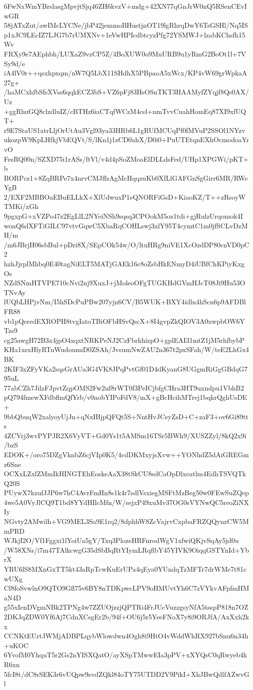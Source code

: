 6FwNxWmYBrslasgMpvjtSjq46ZH6kvzV+mdg+42XN77qGnJrW0nQ5RSenCEvIwGR
58jATxZut/awIMcLYCNe/jbP42jemmoBHustjnOT19lgRhrqDwY6TsGSHl/Nq5IS
p1xJC9LEcIZ7LJG7b7rUMXNv+1eVwHPIcdbtcyzPfg72YSMWJ+lzabKChsfh15Wv
FRXy9e7AEphbh/LUXaZ9vzCP5Z/4BoXUW0o9MuURB9u1yRmG2BoOt1l+7VSy9d/e
iA4lV0r++qsxhpxqm/nW7Q5LbX11SHdhX5PBpaoA5xWcx/KP4vW69grWpkaA27g+
/haMCxhfbSfsXVss6qqkECZ3bS+VZ6pFj83HsOSnTKT3HAAMyfZYqjf8Qs0AX/Uz
+ggRhuGQ8clzdluIZ/cBTHz6iaCTqfWCzM4csl+nmTvvCuahHomEq87XI9xfUQT+
r9E7StaUS1atrLljOrUtAu3Vgl93ya33HRb6L1gRUfMCUqPf0fMVuP2SSOl1NYzv
ukozpW9KpLHfkjVbEQVt/S/lKn1j1zCD0ahX/D0i0+PuUTEtqnEXhOcmodoaYrvO
FesRQ00n/SZXD75i1rASs/ftVl/v4d4pSoZMoaElDLLdsFed/UHp1XPGWi/pKT+b
BORPcz1+8ZqBRPe7x4nrvCMJffzAgMcHqqzuKb0XfLlGAFGnSgGirr6MR/RWeYgB
2/EXF2MBBOaEBuELLkX+XlUdwuxP1eQNORFiGsD+KiaoKZ/T++zRsoyWTMKi/xGh
9pgxpG+xVZPo47z2EgLlL2NYeiNSh9sqsq3CPOokM5oz1tdi+gjRulzUrqomok4I
wonQ6dXFTiGILC97vtvGqwC5XbaRqCOHLswj3xlY95T4cymtC1m0jfSCLvDzMH/m
/m6JBrjH06sbBul+pDri8X/SEpCOk54w/O/ltuHRg9niVE1XcOzdDP80cnVD0pC2
hzhJjrplMhbq0E40tagNiELT5MATjGAEk16c8oZsbHkENmyD4iUBfChKPiyKxgOs
NZdSNmHTVPE710cNvi2nj9XuxJ+jMoleoOFgTUGKHdGVmHJcT08Ji9Hu53OTNvAy
lUQbLHPjvNm/I5hSDcPuPBw207yjn6CV/B5WUK+BXY4idln4hScn6p9AFDBlFR88
vb1pQeredEXROPH8tvgIatoTBiOFbHSvQscX+8I4gvpZkQIOV3A0xwpbOW6YTzs9
cg25awgH72B3x4jpO4xqxtNRKPeNJ2CzFbrkhizpO+gplEAI31mtZ1jM5rhfbybP
KHa1xsxHlyRTuWudounuD0ZSAh/JvsumNwZAU2n367t2pxSFah/W/teE2LhGx4BK
2KIF3xZFyVKa2sqsGrAUa3G4VK8JPqPvtGf01D4dKyanG8UGgmRiGgGBdqG795uL
77abCZh7JilzFJpvtZqpOMS2Fw2uf8rWT0f3PeICjbfgCHra3HT9uxndpu1VbhB2
pQ794fmewXFdbflmQfYrb/v0nobYIPoFdV8/mX+gBcHcihMTrej1bqkrQghUsDE+
9bbQbuqW2xalyoyUjJn+qNxIBjpQFQt5S+NntHvJCeyZsD+C+zaF3+ov6Gi89tts
4ZCVrj3wvPYPJR2X6VyVT+Gd0Ys1t5AMSm16TSr5BWh9/XUSZZyl/8kQ2x9i/bzS
EDOK+/oro75DZgVknbZ6cjVIp0K5/4cdDKMxyjsXvw++YONhdZ5dAiGREGmz6Sne
OCXxLZxlZMmIkHINGTEhEoskeAaX38tSkCU8sdCaOpDlxeatlm4EdhTSVQTkQ20S
PUywX7kzufJJP6w7hC4AvrFmHn8s1k4r7sdlVsxiegMSFtMzBeg50w0FEwSuZQep
4we5A0VyJlCQ9T1bd8YYdHIlcMfn/W/sejxP49xuMv37OG0sVYNwQC5reoZiNXIy
NGvty2AMwilh+VG9MEL3Sa9E1rq2/8dphhW8ZcVajrvCxpbaFRZQQynzCW5MmPRD
WJkjI2O/Vf1Fggxi1lYoiUa5gY/Txq3PlozeHRFnrodWgV1xfwiQKjvSqAy5jd0u
/W58XNs/i7m47TAlkcwgG35dSbBqRtYIymLRqflbY45YIVK9OiqqGSTYnId+YbrX
YRU6lS8MXnGxTT5kt43aRpTcwKuErUPa4qEya0YUndqTzMFTr7drWMe7t81cwUXg
Cf8foSvwlnO9QTO9Gfl75v6BY8nTDKpwcLPV9oHMUvtYh6C7zVYkvAFpfmHMaN4D
g55xIenDVgmNBk2TPNg4w7ZZUOjzzjQPTRi4FrJUcVuzzgsyNfA5tsspP818n7OZ
2DKJqZDW0Yf6Aj7CdnXCsgEr2b/94f+OU6j5r5YeeFNoX7y8i9ORJfA/AxXxh2kx
CCNKtEUrtJWMjADBPLqybWlowdwn4Ogh8i9HtO4vWddWhRX927bSnu6n34h+uKOC
6YvofM0YhquT5r2Gs2nYISXQatO/ayXSpTMwwEIa3pPV+xXYQsC0qRwyeb4kR6xn
5fcI8t/dC8rSEK3r6vUQpw9svdZQkl84oTY75UTDD2V9PikI+XhJBwQdlfAZwvGl
